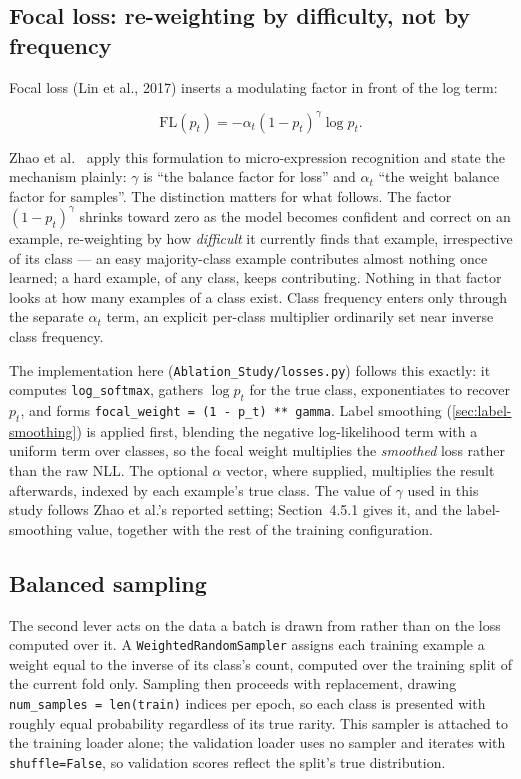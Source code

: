 \subsection{Focal loss: re-weighting by difficulty, not by frequency}
\label{sec:focal-loss}

Focal loss (Lin et al., 2017) inserts a modulating factor in front of the log term:

\[
	\text{FL}(p_t) = -\alpha_t (1-p_t)^{\gamma} \log p_t.
\]

Zhao et al.~\cite{zhaoS2021} apply this formulation to micro-expression recognition and state the mechanism plainly: $\gamma$ is ``the balance factor for loss'' and $\alpha_t$ ``the weight balance factor for samples''. The distinction matters for what follows. The factor $(1-p_t)^{\gamma}$ shrinks toward zero as the model becomes confident and correct on an example, re-weighting by how \textit{difficult} it currently finds that example, irrespective of its class --- an easy majority-class example contributes almost nothing once learned; a hard example, of any class, keeps contributing. Nothing in that factor looks at how many examples of a class exist. Class frequency enters only through the separate $\alpha_t$ term, an explicit per-class multiplier ordinarily set near inverse class frequency.

The implementation here (\texttt{Ablation\_Study/losses.py}) follows this exactly: it computes \texttt{log\_softmax}, gathers $\log p_t$ for the true class, exponentiates to recover $p_t$, and forms \texttt{focal\_weight = (1 - p\_t) ** gamma}. Label smoothing (\autoref{sec:label-smoothing}) is applied first, blending the negative log-likelihood term with a uniform term over classes, so the focal weight multiplies the \textit{smoothed} loss rather than the raw NLL. The optional $\alpha$ vector, where supplied, multiplies the result afterwards, indexed by each example's true class. The value of $\gamma$ used in this study follows Zhao et al.'s reported setting; Section~4.5.1 gives it, and the label-smoothing value, together with the rest of the training configuration.

\subsection{Balanced sampling}
\label{sec:balanced-sampling}

The second lever acts on the data a batch is drawn from rather than on the loss computed over it. A \texttt{WeightedRandomSampler} assigns each training example a weight equal to the inverse of its class's count, computed over the training split of the current fold only. Sampling then proceeds with replacement, drawing \texttt{num\_samples = len(train)} indices per epoch, so each class is presented with roughly equal probability regardless of its true rarity. This sampler is attached to the training loader alone; the validation loader uses no sampler and iterates with \texttt{shuffle=False}, so validation scores reflect the split's true distribution.

